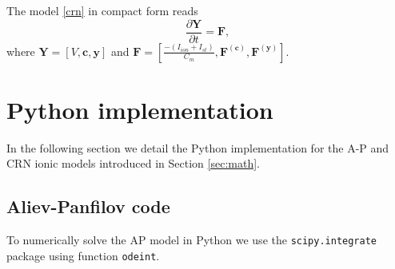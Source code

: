 \documentclass[11pt,a4paper]{article}
\begin{document}
The model \eqref{crn} in compact form reads
\begin{equation}
\label{crn_compact}
\dfrac{\partial \mathbf{Y}}{\partial t} = \mathbf{F},
\end{equation}
where $\mathbf{Y}=[V,\mathbf{c},\mathbf{y}]$ and $\mathbf{F}=\left[ \tfrac{-(I_{ion}+I_{st})}{C_m}, \mathbf{F^{(c)}}, \mathbf{F^{(y)}} \right]$.

\section{Python implementation}\label{sec:python}
In the following section we detail the Python implementation for the A-P and CRN ionic models introduced in Section \ref{sec:math}. 

\subsection{Aliev-Panfilov code}\label{subsec:python_ap}
To numerically solve the AP model in Python we use the \verb|scipy.integrate| package using function \verb|odeint|.
\end{document}
